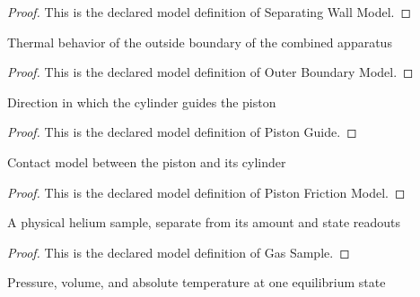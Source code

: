 \begin{proof}
  This is the declared model definition of Separating Wall Model.
\end{proof}
\begin{definition}
  \label{def:physics:phyx-mini-0436:phyxminiproblems-problemphyxmini0436-outerboundarymodel}
  Thermal behavior of the outside boundary of the combined apparatus
\end{definition}
\begin{proof}
  This is the declared model definition of Outer Boundary Model.
\end{proof}
\begin{definition}
  \label{def:physics:phyx-mini-0436:phyxminiproblems-problemphyxmini0436-pistonguide}
  Direction in which the cylinder guides the piston
\end{definition}
\begin{proof}
  This is the declared model definition of Piston Guide.
\end{proof}
\begin{definition}
  \label{def:physics:phyx-mini-0436:phyxminiproblems-problemphyxmini0436-pistonfrictionmodel}
  Contact model between the piston and its cylinder
\end{definition}
\begin{proof}
  This is the declared model definition of Piston Friction Model.
\end{proof}
\begin{definition}
  \label{def:physics:phyx-mini-0436:phyxminiproblems-problemphyxmini0436-gassample}
  A physical helium sample, separate from its amount and state readouts
\end{definition}
\begin{proof}
  This is the declared model definition of Gas Sample.
\end{proof}
\begin{definition}
  \label{def:physics:phyx-mini-0436:phyxminiproblems-problemphyxmini0436-thermodynamicstate}
  Pressure, volume, and absolute temperature at one equilibrium state
\end{definition}
